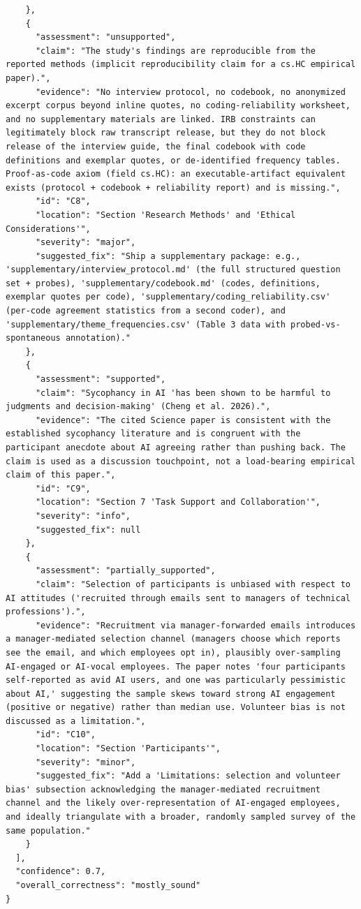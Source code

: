 \documentclass[11pt]{article}
\begin{document}
\begin{verbatim}
    },
    {
      "assessment": "unsupported",
      "claim": "The study's findings are reproducible from the reported methods (implicit reproducibility claim for a cs.HC empirical paper).",
      "evidence": "No interview protocol, no codebook, no anonymized excerpt corpus beyond inline quotes, no coding-reliability worksheet, and no supplementary materials are linked. IRB constraints can legitimately block raw transcript release, but they do not block release of the interview guide, the final codebook with code definitions and exemplar quotes, or de-identified frequency tables. Proof-as-code axiom (field cs.HC): an executable-artifact equivalent exists (protocol + codebook + reliability report) and is missing.",
      "id": "C8",
      "location": "Section 'Research Methods' and 'Ethical Considerations'",
      "severity": "major",
      "suggested_fix": "Ship a supplementary package: e.g., 'supplementary/interview_protocol.md' (the full structured question set + probes), 'supplementary/codebook.md' (codes, definitions, exemplar quotes per code), 'supplementary/coding_reliability.csv' (per-code agreement statistics from a second coder), and 'supplementary/theme_frequencies.csv' (Table 3 data with probed-vs-spontaneous annotation)."
    },
    {
      "assessment": "supported",
      "claim": "Sycophancy in AI 'has been shown to be harmful to judgments and decision-making' (Cheng et al. 2026).",
      "evidence": "The cited Science paper is consistent with the established sycophancy literature and is congruent with the participant anecdote about AI agreeing rather than pushing back. The claim is used as a discussion touchpoint, not a load-bearing empirical claim of this paper.",
      "id": "C9",
      "location": "Section 7 'Task Support and Collaboration'",
      "severity": "info",
      "suggested_fix": null
    },
    {
      "assessment": "partially_supported",
      "claim": "Selection of participants is unbiased with respect to AI attitudes ('recruited through emails sent to managers of technical professions').",
      "evidence": "Recruitment via manager-forwarded emails introduces a manager-mediated selection channel (managers choose which reports see the email, and which employees opt in), plausibly over-sampling AI-engaged or AI-vocal employees. The paper notes 'four participants self-reported as avid AI users, and one was particularly pessimistic about AI,' suggesting the sample skews toward strong AI engagement (positive or negative) rather than median use. Volunteer bias is not discussed as a limitation.",
      "id": "C10",
      "location": "Section 'Participants'",
      "severity": "minor",
      "suggested_fix": "Add a 'Limitations: selection and volunteer bias' subsection acknowledging the manager-mediated recruitment channel and the likely over-representation of AI-engaged employees, and ideally triangulate with a broader, randomly sampled survey of the same population."
    }
  ],
  "confidence": 0.7,
  "overall_correctness": "mostly_sound"
}
\end{verbatim}
\end{document}
